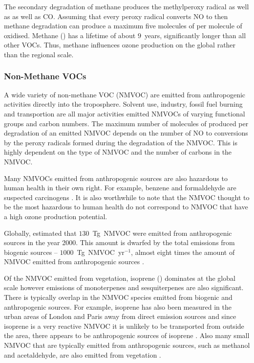 The secondary degradation of methane produces the methylperoxy radical  as well as  as well as CO.
Assuming that every peroxy radical converts NO to  then methane degradation can produce a maximum five molecules of  per molecule of  oxidised.
Methane () has a lifetime of about $9$~years, significantly longer than all other VOCs.
Thus, methane influences ozone production on the global rather than the regional scale.  

\subsubsection{Non-Methane VOCs}
A wide variety of non-methane VOC (NMVOC) are emitted from anthropogenic activities directly into the troposphere.
Solvent use, industry, fossil fuel burning and transportion are all major activities emitted NMVOCs of varying functional groups and carbon numbers.
The maximum number of molecules of  produced per degradation of an emitted NMVOC depends on the number of NO to  conversions by the peroxy radicals formed during the degradation of the NMVOC.
This is highly dependent on the type of NMVOC and the number of carbons in the NMVOC.

Many NMVOCs emitted from anthropogenic sources are also hazardous to human health in their own right.
For example, benzene and formaldehyde are suspected carcinogens \citep{Laurent:2014}.
It is also worthwhile to note that the NMVOC thought to be the most hazardous to human health do not correspond to NMVOC that have a high ozone production potential.

Globally, \citet{Lamarque:2010} estimated that $130$~Tg~NMVOC were emitted from anthropogenic sources in the year 2000.
This amount is dwarfed by the total emissions from biogenic sources -- $1000$~Tg~NMVOC~yr$^{-1}$, almost eight times the amount of NMVOC emitted from anthropogenic sources \citep{Guenther:2012}.

Of the NMVOC emitted from vegetation, isoprene () dominates at the global scale however emissions of monoterpenes and sesquiterpenes are also significant.
There is typically overlap in the NMVOC species emitted from biogenic and anthropogenic sources. 
For example, isoprene has also been measured in the urban areas of London and Paris away from direct emission sources and since isoprene is a very reactive NMVOC it is unlikely to be transported from outside the area, there appears to be anthropogenic sources of isoprene \citep{vonSchneidemesser:2011}.
Also many small NMVOC that are typically emitted from anthropogenic sources, such as methanol and acetaldehyde, are also emitted from vegetation \citep{Guenther:2012}.

